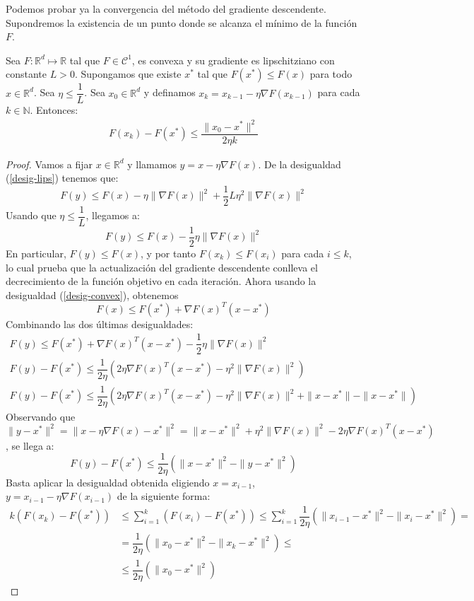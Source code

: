 Podemos probar ya la convergencia del método del gradiente descendente. Supondremos la existencia de un punto donde se alcanza el mínimo de la función $F$. 
\begin{prop} \label{prop:convergencia_grad_desc}
	Sea $F \colon \mathbb{R}^d \mapsto \mathbb{R}$ tal que $F \in \mathcal{C}^1$, es convexa y su gradiente es lipschitziano con constante $L>0$. Supongamos que existe $x^*$ tal que $F(x^*) \leq F(x)$ para todo $x \in \mathbb{R}^d$. Sea $\eta \leq \dfrac{1}{L}$. Sea $x_0 \in \mathbb{R}^d$ y definamos $x_k = x_{k-1} - \eta \nabla F(x_{k-1})$ para cada $k \in \mathbb{N}$. Entonces:
	\begin{align*}
		F(x_k) - F(x^*) \leq \dfrac{\| x_0 - x^* \|^2}{2 \eta k}
	\end{align*} 
\end{prop}

\begin{proof}
	Vamos a fijar $x \in \mathbb{R}^d$ y llamamos $y = x - \eta \nabla F(x)$. De la desigualdad (\ref{desig-lips}) tenemos que:
	$$ F(y) \leq F(x) - \eta \| \nabla F(x) \|^2 + \dfrac{1}{2} L \eta^2 \| \nabla F(x) \|^2 $$
	Usando que $\eta \leq \dfrac{1}{L}$, llegamos a:
	$$ F(y) \leq F(x) - \dfrac{1}{2} \eta \| \nabla F(x) \|^2 $$
	En particular, $F(y) \leq F(x)$, y por tanto $F(x_k) \leq F(x_i)$ para cada $i \leq k$, lo cual prueba que la actualización del gradiente descendente conlleva el decrecimiento de la función objetivo en cada iteración. Ahora usando la desigualdad (\ref{desig-convex}), obtenemos
	$$ F(x) \leq F(x^*) + \nabla F(x)^T (x-x^*)$$
	Combinando las dos últimas desigualdades:
	\begin{gather*}
		F(y)  \leq F(x^*) + \nabla F(x)^T (x-x^*) - \dfrac{1}{2} \eta \| \nabla F(x) \|^2\\
		F(y) - F(x^*) \leq \dfrac{1}{2 \eta} \left( 2 \eta \nabla F(x)^T (x-x^*) - \eta^2 \| \nabla F(x) \|^2 \right)\\
		F(y) - F(x^*) \leq \dfrac{1}{2 \eta} \left( 2 \eta \nabla F(x)^T (x-x^*) - \eta^2 \| \nabla F(x) \|^2 + \| x - x^*\| - \| x - x^*\| \right)
	\end{gather*}
	Observando que $\| y - x^* \|^2 = \| x - \eta \nabla F(x) - x^* \|^2 = \| x - x^*\|^2 + \eta^2 \| \nabla F(x) \|^2 - 2 \eta \nabla F(x)^T (x - x^*)$, se llega a:
	$$ F(y) - F(x^*) \leq \dfrac{1}{2 \eta } \left( \| x - x^*\|^2 - \| y - x^*\|^2 \right) $$
	Basta aplicar la desigualdad obtenida eligiendo $x = x_{i-1}$, $y = x_{i-1} - \eta \nabla F(x_{i-1}) $ de la siguiente forma:
	\begin{align*}
		k \left( F(x_k) - F(x^*) \right) & \leq  \sum_{i=1}^{k} \left( F(x_i) - F(x^*) \right) \leq \sum_{i=1}^{k} \dfrac{1}{2 \eta } \left( \| x_{i-1} - x^*\|^2 - \| x_i - x^*\|^2 \right) = \\
		& = \dfrac{1}{2 \eta } \left( \| x_0 - x^*\|^2 - \| x_k - x^*\|^2 \right) \leq \\
		& \leq \dfrac{1}{2 \eta } \left( \| x_0 - x^*\|^2 \right)
	\end{align*}
\end{proof}

